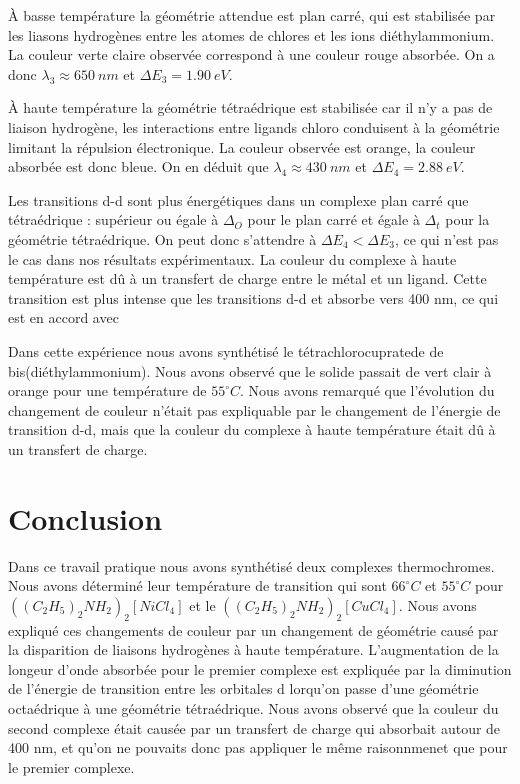 \documentclass[12pt]{article}
\begin{document}
À basse température la géométrie attendue est plan carré, qui est stabilisée par les liasons hydrogènes entre les atomes de chlores et les ions diéthylammonium.
La couleur verte claire observée correspond à une couleur rouge absorbée.
On a donc $\lambda_3\approx 650 \ nm$ et $\Delta E_3 = 1.90 \ eV$.

À haute température la géométrie tétraédrique est stabilisée car il n'y a pas de liaison hydrogène, les interactions entre ligands chloro conduisent à la géométrie limitant la répulsion électronique.
La couleur observée est orange, la couleur absorbée est donc bleue. 
On en déduit que $\lambda_4\approx 430 \ nm$ et $\Delta E_4=2.88 \ eV$.

Les transitions d-d sont plus énergétiques dans un complexe plan carré que tétraédrique : supérieur ou égale à $\Delta_O$ pour le plan carré et égale à $\Delta_t$ pour la géométrie tétraédrique.
On peut donc s'attendre à $\Delta E_4 < \Delta E_3$, ce qui n'est pas le cas dans nos résultats expérimentaux.
La couleur du complexe à haute température est dû à un transfert de charge entre le métal et un ligand.
Cette transition est plus intense que les transitions d-d et absorbe vers 400 nm, ce qui est en accord avec 

Dans cette expérience nous avons synthétisé le  tétrachlorocupratede de bis(diéthylammonium). Nous avons observé que le solide passait de vert clair à orange pour une température de $55 ^\circ C$.
Nous avons remarqué que l'évolution du changement de couleur n'était pas expliquable par le changement de l'énergie de transition d-d, mais que la couleur du complexe à haute température était dû à un transfert de charge.

\section{Conclusion}

Dans ce travail pratique nous avons synthétisé deux complexes thermochromes.
Nous avons déterminé leur température de transition qui sont $66 ^\circ C$ et $55 ^\circ C$ pour $((C_2H_5)_2NH_2)_2[NiCl_4]$ et le  $((C_2H_5)_2NH_2)_2[CuCl_4]$.
Nous avons expliqué ces changements de couleur par un changement de géométrie causé par la disparition de liaisons hydrogènes à haute température.
L'augmentation de la longeur d'onde absorbée pour le premier complexe est expliquée par la diminution de l'énergie de transition entre les orbitales d lorqu'on passe d'une géométrie octaédrique à une géométrie tétraédrique.
Nous avons observé que la couleur du second complexe était causée par un transfert de charge qui absorbait autour de 400 nm, et qu'on ne pouvaits donc pas appliquer le même raisonnmenet que pour le premier complexe. 
\end{document}
